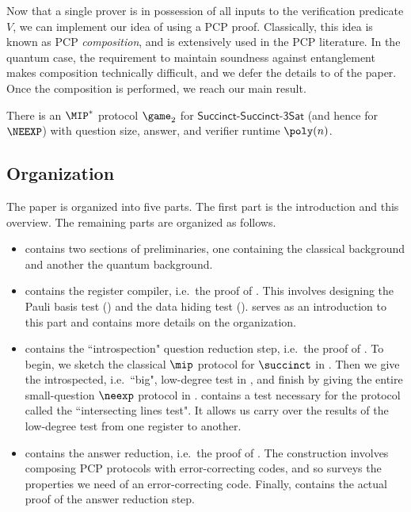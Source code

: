     Now that a single prover is in possession of all inputs to the
    verification predicate $V$, we can implement our idea of using a
    PCP proof. Classically, this idea is known as PCP
    \emph{composition}, and is extensively used in the PCP
    literature. In the quantum case, the requirement to maintain soundness against
    entanglement makes composition technically difficult, and we defer
    the details to  of the paper. Once the
    composition is performed, we reach our main result.
    \begin{infthm}\label{thm:whatevewre}
      There is an $\MIP^*$ protocol $\game_{2}$ for $\mathsf{Succinct}$-$\mathsf{Succinct}$-$\mathsf{3Sat}$
      (and hence for $\NEEXP$) with
      question size, answer, and verifier runtime $\poly(n)$.
    \end{infthm}
    
\subsection{Organization}

The paper is organized into five parts.  The first part is the introduction and this overview. The remaining parts are organized as follows.
\begin{itemize}
\item {} contains two sections of preliminaries, one containing the classical background and another the quantum background.
\item {} contains the register compiler, i.e.\ the proof of .
	This involves designing the Pauli basis test () and the data hiding test ().
	 serves as an introduction to this part and contains more details on the organization.
\item {} contains the ``introspection" question reduction step, i.e.\ the proof of .
	To begin, we sketch the classical $\mip$ protocol for $\succinct$ in .
	Then we give the introspected, i.e.\ ``big", low-degree test in ,
	and finish by giving the entire small-question $\neexp$ protocol in .
	 contains a test necessary for the protocol called the ``intersecting lines test".
	It allows us carry over the results of the low-degree test from one register to another.
\item {} contains the answer reduction, i.e.\ the proof of .
	The construction involves composing PCP protocols with error-correcting codes, and so  surveys the properties we need of an error-correcting code.
	Finally,  contains the actual proof of the answer reduction step.
\end{itemize}

